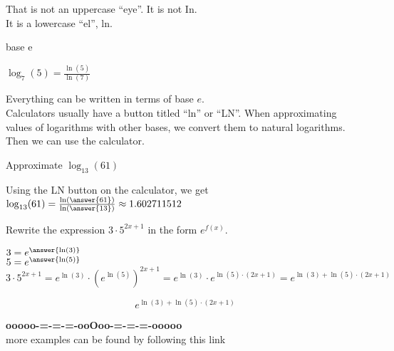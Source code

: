 \documentclass{ximera}
\begin{document}
\begin{warning}
That is not an uppercase ``eye''.  It is not In.  \\

It is a lowercase ``el'', ln.
\end{warning}




\begin{example}  base e


$\log_7(5) = \frac{\ln(5)}{\ln(7)}$


\end{example}
Everything can be written in terms of base $e$. \\


Calculators usually have a button titled ``ln'' or ``LN''.  When approximating values of logarithms with other bases, we convert them to natural logarithms.  Then we can use the calculator.









\begin{example}  


Approximate $\log_{13}(61)$


\begin{explanation}


Using the LN button on the calculator, we get $\log_{13}(61) = \frac{\ln\left(\answer{61}\right)}{\ln\left(\answer{13}\right)} \approx 1.602711512$
\end{explanation}
\end{example}








\begin{example}  


Rewrite the expression $3 \cdot 5^{2x + 1}$ in the form $e^{f(x)}$.


\begin{explanation}


$3 = e^{\answer{\ln(3)}}$ \\


$5 = e^{\answer{\ln(5)}}$ \\


\[   3 \cdot 5^{2x + 1} = e^{\ln(3)} \cdot (e^{\ln(5)})^{2x + 1}  =  e^{\ln(3)} \cdot e^{\ln(5) \cdot (2x + 1)}  = e^{\ln(3) + \ln(5) \cdot (2x + 1)} \]


\[  e^{\ln(3) + \ln(5) \cdot (2x + 1)} \] 

\end{explanation}
\end{example}














\begin{center}
\textbf{\textcolor{green!50!black}{ooooo-=-=-=-ooOoo-=-=-=-ooooo}} \\

more examples can be found by following this link\\ 

\end{center}
\end{document}
